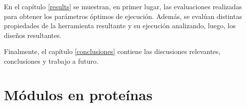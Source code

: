 En el capítulo \ref{results} se muestran, en primer lugar, las evaluaciones realizadas para obtener los parámetros óptimos de ejecución. 
Además, se evalúan distintas propiedades de la herramienta resultante y su ejecución analizando, luego, los diseños resultantes. 

Finalmente, el capítulo \ref{conclusiones} contiene las discusiones relevantes, conclusiones y trabajo a futuro.






\section{Módulos en proteínas}
\label{proteinLandscape}
% 

